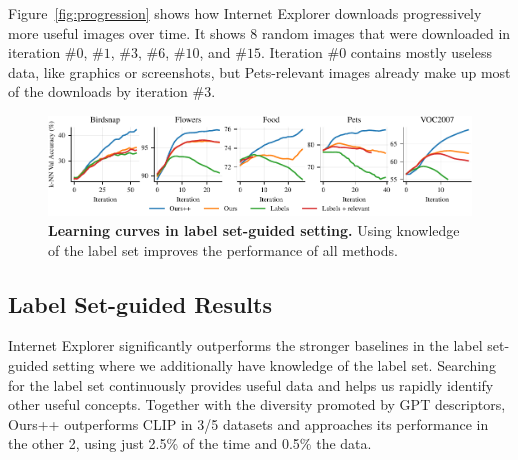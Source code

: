Figure~\ref{fig:progression} shows how Internet Explorer downloads progressively more useful images over time. It shows 8 random images that were downloaded in iteration $\#0$, $\#1$, $\#3$, $\#6$, $\#10$, and $\#15$. Iteration $\#0$ contains mostly useless data, like graphics or screenshots, but Pets-relevant images already make up most of the downloads by iteration $\#3$. 


\begin{figure}[t]
    \centering
    \includegraphics[width=\linewidth]{figures/semisup-curves-updated.pdf}
    \vspace{-0.3in}
    \caption{\textbf{Learning curves in label set-guided setting.} Using knowledge of the label set improves the performance of all methods. }
    \label{fig:semisup_learning_curves}
\end{figure}


\subsection{Label Set-guided Results}
Internet Explorer significantly outperforms the stronger baselines in the label set-guided setting where we additionally have knowledge of the label set. Searching for the label set continuously provides useful data and helps us rapidly identify other useful concepts. Together with the diversity promoted by GPT descriptors, Ours++ outperforms CLIP in 3/5 datasets and approaches its performance in the other 2, using just 2.5\% of the time and 0.5\% the data.

